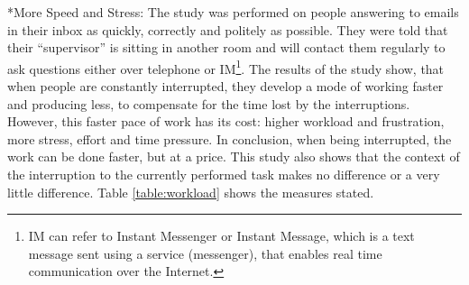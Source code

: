 \documentclass[11pt,singleside]{myfithesis2}
\makeatletter
\renewcommand\paragraph{
   \vspace{-10pt}
   \@startsection{paragraph}{4}{0mm}
      {\baselineskip}
      {- 5pt}
      {\normalfont\normalsize\bfseries}
}
\makeatother
\begin{document}
\paragraph*{More Speed and Stress: } The study \cite{studySpeedAndStress} was performed on people answering to emails in their inbox as quickly, correctly and politely as possible. They were told that their ``supervisor'' is sitting in another room and will contact them regularly to ask questions either over telephone or IM\footnote{IM can refer to Instant Messenger or Instant Message, which is a text message sent using a service (messenger), that enables real time communication over the Internet.}. The results of the study show, that when people are constantly interrupted, they develop a mode of working faster and producing less, to compensate for the time lost by the interruptions. However, this faster pace of work has its cost: higher workload and frustration, more stress, effort and time pressure. In conclusion, when being interrupted, the work can be done faster, but at a price. This study also shows that the context of the interruption to the currently performed task makes no difference or a very little difference. Table \ref{table:workload} shows the measures stated.
\begin{table}[h]
\centering
{}
\caption{Mean workload measures across interruption types. Scale is 1(low)-20(high).}
\label{table:workload}
\end{table}
\end{document}
